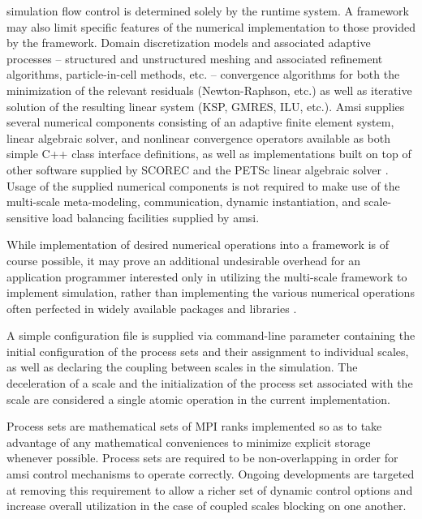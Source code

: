 \documentclass[11pt]{siamltex1213}
\begin{document}
simulation flow control is determined solely by the runtime system. A framework may also limit specific features of the numerical implementation to those provided by the framework. Domain discretization models and associated adaptive processes -- structured and unstructured meshing and associated refinement algorithms, particle-in-cell methods, etc. -- convergence algorithms for both the minimization of the relevant residuals (Newton-Raphson, etc.) as well as iterative solution of the resulting linear system (KSP, GMRES, ILU, etc.). Amsi supplies several numerical components consisting of an adaptive finite element system, linear algebraic solver, and nonlinear convergence operators available as both simple C++ class interface definitions, as well as implementations built on top of other software supplied by SCOREC \cite{core} and the PETSc linear algebraic solver \cite{petsc-web-page} \cite{petsc-user-ref} \cite{petsc-efficient}. Usage of the supplied numerical components is not required to make use of the multi-scale meta-modeling, communication, dynamic instantiation, and scale-sensitive load balancing facilities supplied by amsi.

While implementation of desired numerical operations into a framework is of course possible, it may prove an additional undesirable overhead for an application programmer interested only in utilizing the multi-scale framework to implement simulation, rather than implementing the various numerical operations often perfected in widely available packages and libraries \cite{} \cite{} \cite{}.

\label{amsi_scales}
A simple configuration file is supplied via command-line parameter containing the initial configuration of the process sets and their assignment to individual scales, as well as declaring the coupling between scales in the simulation. The deceleration of a scale and the initialization of the process set associated with the scale are considered a single atomic operation in the current implementation.

Process sets are mathematical sets of MPI ranks implemented so as to take advantage of any mathematical conveniences to minimize explicit storage whenever possible. Process sets are required to be non-overlapping in order for amsi control mechanisms to operate correctly. Ongoing developments are targeted at removing this requirement to allow a richer set of dynamic control options and increase overall utilization in the case of coupled scales blocking on one another. 
\end{document}
